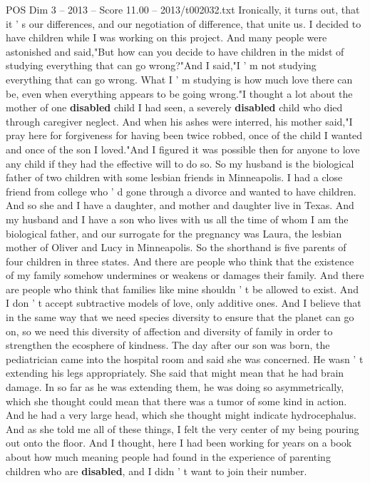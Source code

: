 \begin{textsample}{POS Dim 3 – 2013 – Score 11.00 – 2013/t002032.txt}
Ironically, it turns out, that it ' s our differences, and our negotiation of difference, that unite us.
I decided to have children while I was working on this project.
And many people were astonished and said,"But how can you decide to have children in the midst of studying everything that can go wrong?"And I said,"I ' m not studying everything that can go wrong.
What I ' m studying is how much love there can be, even when everything appears to be going wrong."I thought a lot about the mother of one \textbf{disabled} child I had seen, a severely \textbf{disabled} child who died through caregiver neglect.
And when his ashes were interred, his mother said,"I pray here for forgiveness for having been twice robbed, once of the child I wanted and once of the son I loved."And I figured it was possible then for anyone to love any child if they had the effective will to do so.
So my husband is the biological father of two children with some lesbian friends in Minneapolis.
I had a close friend from college who ' d gone through a divorce and wanted to have children.
And so she and I have a daughter, and mother and daughter live in Texas.
And my husband and I have a son who lives with us all the time of whom I am the biological father, and our surrogate for the pregnancy was Laura, the lesbian mother of Oliver and Lucy in Minneapolis.
So the shorthand is five parents of four children in three states.
And there are people who think that the existence of my family somehow undermines or weakens or damages their family.
And there are people who think that families like mine shouldn ' t be allowed to exist.
And I don ' t accept subtractive models of love, only additive ones.
And I believe that in the same way that we need species diversity to ensure that the planet can go on, so we need this diversity of affection and diversity of family in order to strengthen the ecosphere of kindness.
The day after our son was born, the pediatrician came into the hospital room and said she was concerned.
He wasn ' t extending his legs appropriately.
She said that might mean that he had brain damage.
In so far as he was extending them, he was doing so asymmetrically, which she thought could mean that there was a tumor of some kind in action.
And he had a very large head, which she thought might indicate hydrocephalus.
And as she told me all of these things, I felt the very center of my being pouring out onto the floor.
And I thought, here I had been working for years on a book about how much meaning people had found in the experience of parenting children who are \textbf{disabled}, and I didn ' t want to join their number.

\end{textsample}
